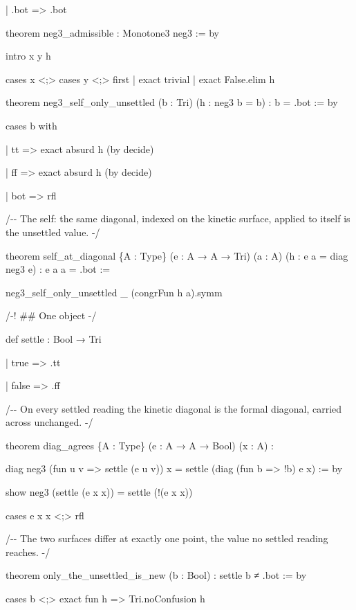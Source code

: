 \documentclass[10pt,twocolumn]{article}
\newenvironment{Shaded}{}{}
\newcommand{\NormalTok}[1]{#1}
\providecommand{\NormalTok}[1]{#1}
\providecommand{\NormalTok}[1]{#1}
\begin{document}
\begin{strip}
\begin{Shaded}
\begin{Highlighting}[]
\NormalTok{  | .bot =\textgreater{} .bot}

\NormalTok{theorem neg3\_admissible : Monotone3 neg3 := by}

\NormalTok{  intro x y h}

\NormalTok{  cases x \textless{};\textgreater{} cases y \textless{};\textgreater{} first | exact trivial | exact False.elim h}

\NormalTok{theorem neg3\_self\_only\_unsettled (b : Tri) (h : neg3 b = b) : b = .bot := by}

\NormalTok{  cases b with}

\NormalTok{  | tt =\textgreater{} exact absurd h (by decide)}

\NormalTok{  | ff =\textgreater{} exact absurd h (by decide)}

\NormalTok{  | bot =\textgreater{} rfl}

\NormalTok{/{-}{-} The self: the same diagonal, indexed on the kinetic surface, applied to itself is the unsettled value. {-}/}

\NormalTok{theorem self\_at\_diagonal \{A : Type\} (e : A → A → Tri) (a : A) (h : e a = diag neg3 e) : e a a = .bot :=}

\NormalTok{  neg3\_self\_only\_unsettled \_ (congrFun h a).symm}

\NormalTok{/{-}! \#\# One object {-}/}

\NormalTok{def settle : Bool → Tri}

\NormalTok{  | true =\textgreater{} .tt}

\NormalTok{  | false =\textgreater{} .ff}

\NormalTok{/{-}{-} On every settled reading the kinetic diagonal is the formal diagonal, carried across unchanged. {-}/}

\NormalTok{theorem diag\_agrees \{A : Type\} (e : A → A → Bool) (x : A) :}

\NormalTok{    diag neg3 (fun u v =\textgreater{} settle (e u v)) x = settle (diag (fun b =\textgreater{} !b) e x) := by}

\NormalTok{  show neg3 (settle (e x x)) = settle (!(e x x))}

\NormalTok{  cases e x x \textless{};\textgreater{} rfl}

\NormalTok{/{-}{-} The two surfaces differ at exactly one point, the value no settled reading reaches. {-}/}

\NormalTok{theorem only\_the\_unsettled\_is\_new (b : Bool) : settle b ≠ .bot := by}

\NormalTok{  cases b \textless{};\textgreater{} exact fun h =\textgreater{} Tri.noConfusion h}


\end{Highlighting}
\end{Shaded}
\end{strip}
\end{document}

